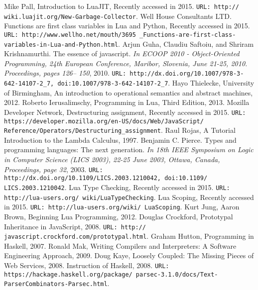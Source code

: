 \begin{thebibliography}{10}
 Mike Pall, Introduction to LuaJIT, Recently accessed in 2015. {\tt URL: http://
wiki.luajit.org/New-Garbage-Collector}.
 Well House Consultants LTD. Functions are first class variables in Lua and Python, Recently accessed in 2015. 
{\tt URL: http://www.wellho.net/mouth/3695
\_Functions-are-first-class-variables-in-Lua-and-Python.html}.
 Arjun Guha, Claudiu Saftoiu, and Shriram Krishnamurthi. The essence of javascript. {\it In ECOOP 2010 - Object-Oriented Programming, 24th European Conference, Maribor, Slovenia, June 21-25, 2010. Proceedings, pages 126– 150}, 2010. {\tt URL: http://dx.doi.org/10.1007/978-3-642-14107-2\_7, doi:10.1007/978-3-642-14107-2\_7}.
 Hayo Thielecke, University of Birmingham, An introduction to operational semantics and abstract machines, 2012.
 Roberto Ierusalimschy, Programming in Lua, Third Edition,  2013.
 Mozilla Developer Network, Destructuring assignment, Recently accessed in 2015. {\tt URL: https://developer.mozilla.org/en-US/docs/Web/JavaScript/
Reference/Operators/Destructuring\_assignment}.
 Raul Rojas, A Tutorial Introduction to the Lambda Calculus, 1997.
 Benjamin C. Pierce. Types and programming languages: The next generation. {\it In 18th IEEE Symposium on Logic in Computer Science (LICS 2003), 22-25 June 2003, Ottawa, Canada, Proceedings, page 32}, 2003. {\tt URL: http://dx.doi.org/10.1109/LICS.2003.1210042, doi:10.1109/ LICS.2003.1210042}.
 Lua Type Checking, Recently accessed in 2015. {\tt URL: http://lua-users.org/
wiki/LuaTypeChecking}.
 Lua Scoping, Recently accessed in 2015. {\tt URL: http://lua-users.org/wiki/
LuaScoping}.
 Kurt Jung, Aaron Brown, Beginning Lua Programming, 2012.
 Douglas Crockford, Prototypal Inheritance in JavaScript, 2008. {\tt URL: http://
javascript.crockford.com/prototypal.html}.
 Graham Hutton, Programming in Haskell, 2007.
 Ronald Mak, Writing Compilers and Interpreters: A Software Engineering Approach, 2009.
 Doug Kaye, Loosely Coupled: The Missing Pieces of Web Services, 2008.
 Instruction of Haskell, 2008. {\tt URL: https://hackage.haskell.org/package/
parsec-3.1.0/docs/Text-ParserCombinators-Parsec.html}.
\\

\end{thebibliography}
